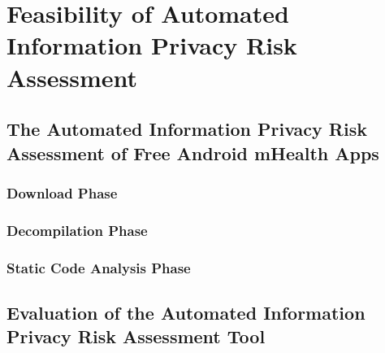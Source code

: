 \section{Feasibility of Automated Information Privacy Risk Assessment}

\subsection{The Automated Information Privacy Risk Assessment of Free Android mHealth Apps}

\subsubsection{Download Phase}

\subsubsection{Decompilation Phase}

\subsubsection{Static Code Analysis Phase}

\subsection{Evaluation of the Automated Information Privacy Risk Assessment Tool}